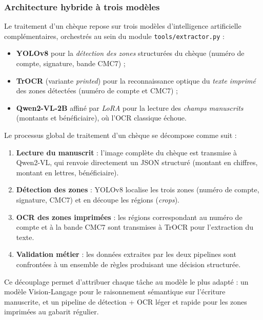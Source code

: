 \subsubsection{Architecture hybride à trois modèles}

Le traitement d'un chèque repose sur trois modèles d'intelligence
artificielle complémentaires, orchestrés au sein du module
\texttt{tools/extractor.py} :

\begin{itemize}
    \item \textbf{YOLOv8} pour la \textit{détection des zones} structurées
    du chèque (numéro de compte, signature, bande CMC7) ;
    \item \textbf{TrOCR} (variante \textit{printed}) pour la reconnaissance
    optique du \textit{texte imprimé} des zones détectées (numéro de compte
    et CMC7) ;
    \item \textbf{Qwen2-VL-2B} affiné par \textit{LoRA} pour la lecture des
    \textit{champs manuscrits} (montants et bénéficiaire), où l'OCR
    classique échoue.
\end{itemize}

Le processus global de traitement d'un chèque se décompose comme suit :
\begin{enumerate}
    \item \textbf{Lecture du manuscrit} : l'image complète du chèque est
    transmise à Qwen2-VL, qui renvoie directement un JSON structuré
    (montant en chiffres, montant en lettres, bénéficiaire).
    \item \textbf{Détection des zones} : YOLOv8 localise les trois zones
    (numéro de compte, signature, CMC7) et en découpe les régions
    (\textit{crops}).
    \item \textbf{OCR des zones imprimées} : les régions correspondant au
    numéro de compte et à la bande CMC7 sont transmises à TrOCR pour
    l'extraction du texte.
    \item \textbf{Validation métier} : les données extraites par les deux
    pipelines sont confrontées à un ensemble de règles produisant une
    décision structurée.
\end{enumerate}

Ce découplage permet d'attribuer chaque tâche au modèle le plus adapté :
un modèle Vision-Langage pour le raisonnement sémantique sur l'écriture
manuscrite, et un pipeline de détection + OCR léger et rapide pour les
zones imprimées au gabarit régulier.

